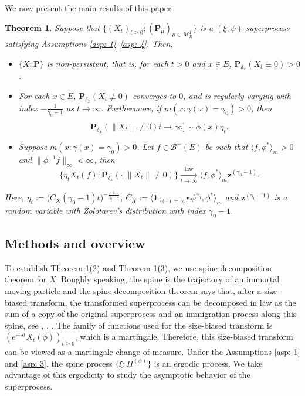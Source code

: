 \documentclass[12pt, a4paper]{amsart}
\newtheorem{thm}{Theorem}[section]
\theoremstyle{definition}
\numberwithin{equation}{section}
\begin{document}
	We now present the main results of this paper:

\begin{thm}
\label{thm: main theorem}
	Suppose that $\{(X_t)_{t\geq 0}; (\mathbf P_\mu)_{\mu \in \mathcal M_E^1}\}$ is a $(\xi, \psi)$-superprocess satisfying
Assumptions \ref{asp: 1}--\ref{asp: 4}. Then,
\begin{itemize}
	\item[(1)] $\{X; \mathbf P\}$ is non-persistent, that is, for each $t > 0$ and $x\in E$, $\mathbf P_{\delta_x}(X_t \equiv 0) > 0$.
	\item[(2)] For each $x\in E$, $\mathbf P_{\delta_x}(X_t \not \equiv 0)$
	converges to $0$, and is regularly varying with index $-\frac{1}{\gamma_0-1}$
as $t\to \infty$.
	Furthermore, if $m(x: \gamma (x)= \gamma_0)>0$, then
\[
	\mathbf P_{\delta_x}(\|X_t\| \neq 0)
	\stackrel[t\to \infty]{}{\sim} \phi(x)\eta_t.
\]
	\item[(3)] Suppose $m( x:\gamma(x)=\gamma_0 )>0$.
	Let $f \in \mathscr B^+(E)$ be  such that $\langle f, \phi^* \rangle_m > 0$  and $\| \phi^{-1}f \|_\infty < \infty$, then
\[
	\{   \eta_t X_t(f) ; \mathbf P_{\delta_x}(\cdot |\|X_t\| \neq 0) \}
	\xrightarrow[t\to \infty]{\operatorname{law}}
	\langle f, \phi^*\rangle_m \mathbf z^{(\gamma_0 - 1)}.
\]
\end{itemize}
	Here, $\eta_t := \big( C_X(\gamma_0 - 1) t \big)^{- \frac {1} {\gamma_0 - 1} }$, $C_X := \langle \mathbf 1_{\gamma(\cdot) = \gamma_0} \kappa \phi^{\gamma_0}, \phi^* \rangle_m$ and $\mathbf z^{(\gamma_0 - 1)}$ is 
 a random variable with Zolotarev's distribution with index $\gamma_0 - 1$.
\end{thm}

\subsection{Methods and overview}
	
	To establish Theorem \ref{thm: main theorem}(2) and Theorem \ref{thm: main theorem}(3), we use spine decomposition theorem for  
    $X$:
	Roughly speaking, the spine is the trajectory of an immortal moving particle and the spine decomposition theorem says that, after a size-biased transform, the transformed superprocess can be decomposed in law as the sum of a copy of the original superprocess and an immigration process along this spine, see \cite{EckhoffKyprianouWinkel2015Spines}, \cite{EnglanderKyprianou2004Local}, \cite{LiuRenSong2009Llog}.
	The family of functions used for the size-biased transform is $(e^{-\lambda t} X_t(\phi))_{t\geq 0}$, which is a martingale.
	Therefore, this size-biased transform can be viewed as a martingale change of measure.
	Under the Assumptions \ref{asp: 1} and \ref{asp: 3},
	the spine process $\{\xi; \Pi^{(\phi)}\}$ is an ergodic process.
	We take advantage of this ergodicity to study the asymptotic behavior of the superprocess.
	
\end{document}
